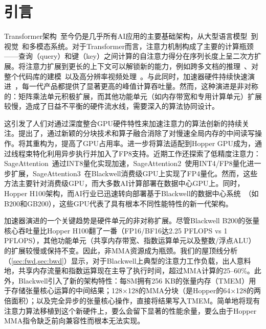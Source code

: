 \section{引言}
\label{sec:intro}

Transformer架构~\citep{vaswani2017attention}至今仍是几乎所有AI应用的主要基础架构，从大型语言模型~\citep{brown2020language}到视觉~\citep{dosovitskiy2020image}和多模态系统。对于Transformer而言，注意力机制构成了主要的计算瓶颈——查询（query）和键（key）之间计算的自注意力得分在序列长度上呈二次方扩展。将注意力扩展到更长的上下文可以解锁新的能力，例如跨多文档的推理~\citep{guo2021longt5,shaham2022scrolls}、对整个代码库的建模~\citep{roziere2023code}以及高分辨率视频处理~\citep{chen2022scaling,ho2022video}。与此同时，加速器硬件持续快速演进~\citep{nvidia2024nvidia}，每一代产品都提供了显著更高的峰值计算吞吐量。然而，这种演进是非对称的：矩阵乘法单元积极扩展，而其他功能单元（如内存带宽和专用计算单元）扩展较慢，造成了日益不平衡的硬件流水线，需要深入的算法协同设计。

这引发了人们对通过深度整合GPU硬件特性来加速注意力的算法创新的持续关注。\citet{dao2022flashattention}提出了\fa，通过新颖的分块技术和算子融合消除了对慢速全局内存的中间读写操作。\citet{dao2023flashattention2}将其重构为，提高了GPU占用率。\citet{shah2024flashattention3}进一步将算法适配到Hopper GPU成为\fat，通过线程束特化利用异步执行并加入了FP8支持。近期工作还探索了低精度注意力：SageAttention~\citep{sageattention}通过INT8量化实现加速，SageAttention2~\citep{sageattention2}使用INT4/FP8量化进一步扩展，SageAttention3~\citep{sageattention3}在Blackwell消费级GPU上实现了FP4量化。然而，这些方法主要针对消费级GPU，而大多数AI计算部署在数据中心GPU上。同时， Hopper H100架构，而AI行业已迅速转向部署基于Blackwell的数据中心系统~\citep{nvidia2024nvidia}（如B200和GB200），这些GPU代表了具有根本不同性能特性的新一代架构。

加速器演进的一个关键趋势是硬件单元的非对称扩展。尽管Blackwell B200的张量核心吞吐量比Hopper H100翻了一番（FP16/BF16达2.25 PFLOPS vs 1 PFLOPS），其他功能单元（共享内存带宽、指数运算单元以及整数/浮点ALU）的扩展较慢或保持不变。因此，非MMA资源成为瓶颈。我们的屋顶线分析（\cref{sec:fwd,sec:bwd}）显示，对于Blackwell上典型的注意力工作负载，出人意料地，共享内存流量和指数运算现在主导了执行时间，超过MMA计算的25--60\%。此外，Blackwell引入了新的架构特性：每SM拥有256 KB的张量内存（TMEM）用于存储张量核心运算的中间结果；128×128的MMA分块（是Hopper的64×128的两倍面积）；以及完全异步的张量核心操作，直接将结果写入TMEM。简单地将现有注意力算法移植到这个新硬件上，要么会留下显著的性能余量，要么由于Hopper MMA指令缺乏前向兼容性而根本无法实现。

